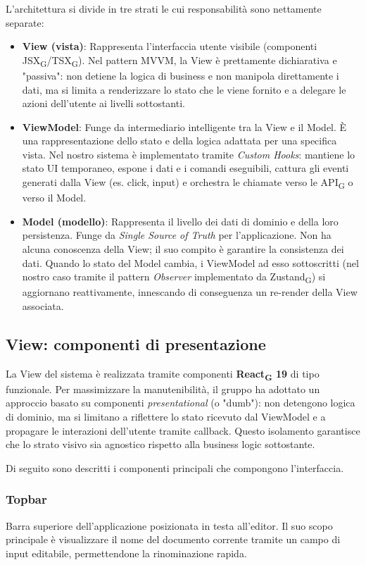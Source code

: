 \documentclass[11pt,a4paper]{article}
\newcommand{\gls}[1]{#1\textsubscript{G}}
\begin{document}
L'architettura si divide in tre strati le cui responsabilità sono nettamente separate:

\begin{itemize}
    \item \textbf{View (vista)}: Rappresenta l'interfaccia utente visibile (componenti \gls{JSX}/\gls{TSX}). Nel pattern MVVM, la View è prettamente dichiarativa e "passiva": non detiene la logica di business e non manipola direttamente i dati, ma si limita a renderizzare lo stato che le viene fornito e a delegare le azioni dell'utente ai livelli sottostanti.
    \item \textbf{ViewModel}: Funge da intermediario intelligente tra la View e il Model. È una rappresentazione dello stato e della logica adattata per una specifica vista. Nel nostro sistema è implementato tramite \textit{Custom Hooks}: mantiene lo stato UI temporaneo, espone i dati e i comandi eseguibili, cattura gli eventi generati dalla View (es. click, input) e orchestra le chiamate verso le \gls{API} o verso il Model.
    \item \textbf{Model (modello)}: Rappresenta il livello dei dati di dominio e della loro persistenza. Funge da \textit{Single Source of Truth} per l'applicazione. Non ha alcuna conoscenza della View; il suo compito è garantire la consistenza dei dati. Quando lo stato del Model cambia, i ViewModel ad esso sottoscritti (nel nostro caso tramite il pattern \textit{Observer} implementato da \gls{Zustand}) si aggiornano reattivamente, innescando di conseguenza un re-render della View associata.
\end{itemize}


\subsection{View: componenti di presentazione}
La View del sistema è realizzata tramite componenti \textbf{\gls{React} 19} di tipo funzionale. Per massimizzare la manutenibilità, il gruppo ha adottato un approccio basato su componenti \textit{presentational} (o "dumb"): non detengono logica di dominio, ma si limitano a riflettere lo stato ricevuto dal ViewModel e a propagare le interazioni dell'utente tramite callback. Questo isolamento garantisce che lo strato visivo sia agnostico rispetto alla business logic sottostante.

Di seguito sono descritti i componenti principali che compongono l'interfaccia.

\subsubsection{Topbar}
Barra superiore dell'applicazione posizionata in testa all'editor. Il suo scopo principale è visualizzare il nome del documento corrente tramite un campo di input editabile, permettendone la rinominazione rapida.
\end{document}
